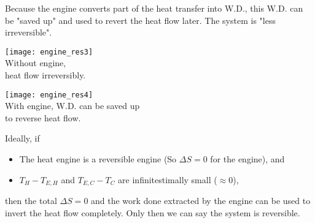 \documentclass[class=article, crop=false, 12pt]{standalone}
\begin{document}
Because the engine converts part of the heat transfer into W.D.,
this W.D. can be "saved up" and used to revert the heat flow later. 
The system is "less irreversible".

\begin{center}
    \begin{minipage}{0.3\linewidth}
        \centering
        \texttt{[image: engine\_res3]}\\
        Without engine,\\ heat flow irreversibly.
    \end{minipage}
    \hspace{0.05\textwidth}
    \begin{minipage}{0.6\linewidth}
        \centering
        \texttt{[image: engine\_res4]}\\
        With engine, W.D. can be saved up\\
        to reverse heat flow.
    \end{minipage}
\end{center}

Ideally, if
\begin{itemize}
    \item The heat engine is a reversible engine (So $\Delta S = 0$ for the engine), and
    \item $T_H - T_{E,H}$ and $T_{E,C} - T_C$ are infinitestimally small ($\approx 0$),
\end{itemize}

then the total $\Delta S=0$ and the work done extracted by the engine can be used to invert the heat flow completely.
Only then we can say the system is reversible.
\end{document}
